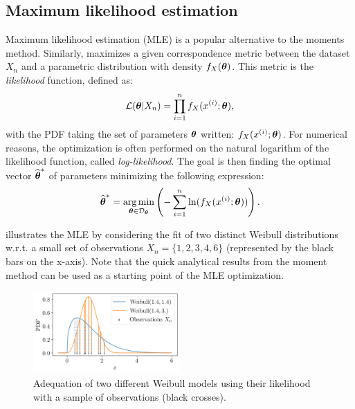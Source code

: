 \subsection*{Maximum likelihood estimation}
Maximum likelihood estimation (MLE) is a popular alternative to the moments method. 
Similarly, maximizes a given correspondence metric between the dataset $X_n$ and a parametric distribution with density $f_X({\boldsymbol{\theta}})$.
This metric is the \textit{likelihood} function, defined as:
\begin{equation}
    \mathcal{L}({\boldsymbol{\theta}}|X_n) = \prod_{i=1}^{n} f_X(x^{(i)}; {\boldsymbol{\theta}}), 
\end{equation}
with the PDF taking the set of parameters ${\boldsymbol{\theta}}$ written: $f_X(x^{(i)}; {\boldsymbol{\theta}})$. 
For numerical reasons, the optimization is often performed on the natural logarithm of the likelihood function, called \textit{log-likelihood}. 
The goal is then finding the optimal vector $\widehat{{\boldsymbol{\theta}}}^*$ of parameters minimizing the following expression: 
\begin{equation}
    \widehat{{\boldsymbol{\theta}}}^* = \operatorname*{arg\,min}_{{\boldsymbol{\theta}} \in \mathcal{D}_{{\boldsymbol{\theta}}}} \left(-\sum_{i=1}^{n} \mathrm{ln}(f_X(x^{(i)}; {\boldsymbol{\theta}})) \right).
\end{equation}

 illustrates the MLE by considering the fit of two distinct Weibull distributions w.r.t. a small set of observations $X_n = \{1, 2, 3, 4, 6\}$ (represented by the black bars on the x-axis).
Note that the quick analytical results from the moment method can be used as a starting point of the MLE optimization. 


\begin{figure}[H]
    \centering
    \includegraphics[width=0.5\textwidth]{../numerical_experiments/chapter1/figures/MLE.png}
    \caption{Adequation of two different Weibull models using their likelihood with a sample of observations (black crosses).}
    \label{fig:MLE}
\end{figure}


